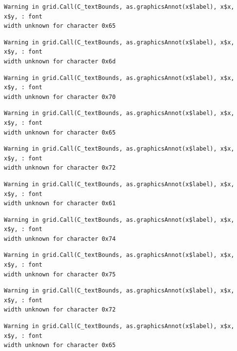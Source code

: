 \documentclass[
  letterpaper,
]{scrbook}
\begin{document}
\begin{verbatim}
Warning in grid.Call(C_textBounds, as.graphicsAnnot(x$label), x$x, x$y, : font
width unknown for character 0x65
\end{verbatim}

\begin{verbatim}
Warning in grid.Call(C_textBounds, as.graphicsAnnot(x$label), x$x, x$y, : font
width unknown for character 0x6d
\end{verbatim}

\begin{verbatim}
Warning in grid.Call(C_textBounds, as.graphicsAnnot(x$label), x$x, x$y, : font
width unknown for character 0x70
\end{verbatim}

\begin{verbatim}
Warning in grid.Call(C_textBounds, as.graphicsAnnot(x$label), x$x, x$y, : font
width unknown for character 0x65
\end{verbatim}

\begin{verbatim}
Warning in grid.Call(C_textBounds, as.graphicsAnnot(x$label), x$x, x$y, : font
width unknown for character 0x72
\end{verbatim}

\begin{verbatim}
Warning in grid.Call(C_textBounds, as.graphicsAnnot(x$label), x$x, x$y, : font
width unknown for character 0x61
\end{verbatim}

\begin{verbatim}
Warning in grid.Call(C_textBounds, as.graphicsAnnot(x$label), x$x, x$y, : font
width unknown for character 0x74
\end{verbatim}

\begin{verbatim}
Warning in grid.Call(C_textBounds, as.graphicsAnnot(x$label), x$x, x$y, : font
width unknown for character 0x75
\end{verbatim}

\begin{verbatim}
Warning in grid.Call(C_textBounds, as.graphicsAnnot(x$label), x$x, x$y, : font
width unknown for character 0x72
\end{verbatim}

\begin{verbatim}
Warning in grid.Call(C_textBounds, as.graphicsAnnot(x$label), x$x, x$y, : font
width unknown for character 0x65
\end{verbatim}
\end{document}
